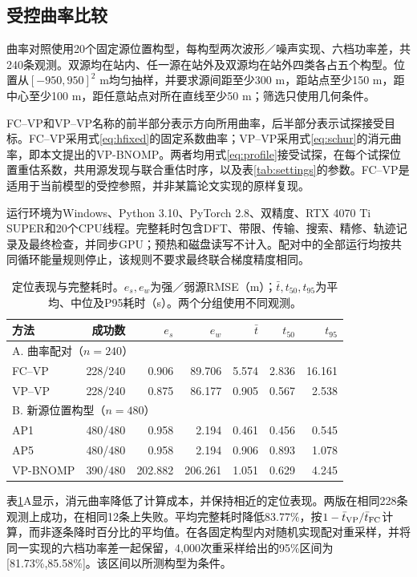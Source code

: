 \documentclass[a4paper,12pt,review]{cas-sc}
\begin{document}
\subsection{受控曲率比较}
曲率对照使用20个固定源位置构型，每构型两次波形／噪声实现、六档功率差，共240条观测。双源均在站内、任一源在站外及双源均在站外四类各占五个构型。位置从$[-950,950]^2$ m均匀抽样，并要求源间距至少300 m，距站点至少150 m，距中心至少100 m，距任意站点对所在直线至少50 m；筛选只使用几何条件。

FC--VP和VP--VP名称的前半部分表示方向所用曲率，后半部分表示试探接受目标。FC--VP采用式\eqref{eq:hfixed}的固定系数曲率；VP--VP采用式\eqref{eq:schur}的消元曲率，即本文提出的VP-BNOMP。两者均用式\eqref{eq:profile}接受试探，在每个试探位置重估系数，共用源发现与联合重估时序，以及表\ref{tab:settings}的参数。FC--VP是适用于当前模型的受控参照，并非某篇论文实现的原样复现。

运行环境为Windows、Python 3.10、PyTorch 2.8、双精度、RTX 4070 Ti SUPER和20个CPU线程。完整耗时包含DFT、带限、传输、搜索、精修、轨迹记录及最终检查，并同步GPU；预热和磁盘读写不计入。配对中的全部运行均按共同循环能量规则停止，该规则不要求最终联合梯度精度相同。

\begin{table}[pos=H]
\caption{定位表现与完整耗时。$e_s,e_w$为强／弱源RMSE（m）；$\bar t,t_{50},t_{95}$为平均、中位及P95耗时（s）。两个分组使用不同观测。}\label{tab:results}
\centering
\begin{tabular}{lrrrrrr}
\toprule
方法 & 成功数 & $e_s$ & $e_w$ & $\bar t$ & $t_{50}$ & $t_{95}$ \\
\midrule
\multicolumn{7}{l}{A. 曲率配对（$n=240$）}\\
FC--VP & 228/240 & 0.906 & 89.706 & 5.574 & 2.836 & 16.161 \\
VP--VP & 228/240 & 0.875 & 86.177 & 0.905 & 0.567 & 2.538 \\
\midrule
\multicolumn{7}{l}{B. 新源位置构型（$n=480$）}\\
AP1 & 480/480 & 0.958 & 2.194 & 0.461 & 0.456 & 0.545 \\
AP5 & 480/480 & 0.958 & 2.194 & 0.906 & 0.893 & 1.078 \\
VP-BNOMP & 390/480 & 202.882 & 206.261 & 1.051 & 0.629 & 4.245 \\
\bottomrule
\end{tabular}
\end{table}

表\ref{tab:results}A显示，消元曲率降低了计算成本，并保持相近的定位表现。两版在相同228条观测上成功，在相同12条上失败。平均完整耗时降低83.77\%，按$1-\bar t_{\rm VP}/\bar t_{\rm FC}$计算，而非逐条降时百分比的平均值。在各固定构型内对随机实现配对重采样，并将同一实现的六档功率差一起保留，4,000次重采样给出的95\%区间为[81.73\%,85.58\%]。该区间以所测构型为条件。
\end{document}
